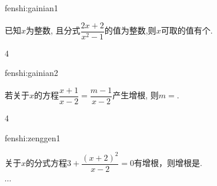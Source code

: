 
\begin{defproblem}{fenshi:gainian1}%
\begin{onlyproblem}%
已知$x$为整数, 且分式$\dfrac{2x+2}{x^2-1}$的值为整数,则$x$可取的值有\underline{\hspace*{1cm}}个.
\end{onlyproblem}%
\begin{onlysolution}%
4
\end{onlysolution}%
\end{defproblem}

\begin{defproblem}{fenshi:gainian2}%
\begin{onlyproblem}%
若关于$x$的方程$\dfrac{x+1}{x-2}=\dfrac{m-1}{x-2}$产生增根, 则$m=$\underline{\hspace*{1cm}}.
\end{onlyproblem}%
\begin{onlysolution}%
4
\end{onlysolution}%
\end{defproblem}


\begin{defproblem}{fenshi:zenggen1}%
\begin{onlyproblem}%
关于$x$的分式方程$3+\dfrac{(x+2)^2}{x-2}=0$有增根，则增根是\underline{\hspace*{2cm}}.
\end{onlyproblem}%
\begin{onlysolution}%
$\cdots$
\end{onlysolution}%
\end{defproblem}



